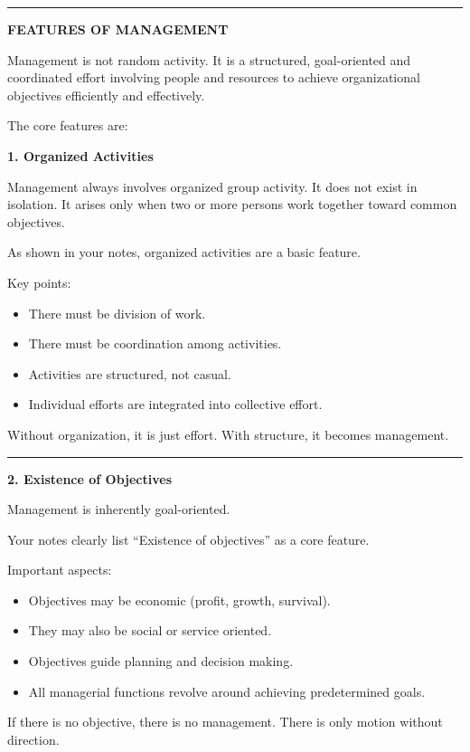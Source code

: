 \documentclass[10pt,a4paper]{article}
\newcommand{\separator}{\vspace{0.4em}\noindent\rule{\linewidth}{0.6pt}\vspace{0.4em}}
\begin{document}
\separator

\begin{center}
  \large\textbf{FEATURES OF MANAGEMENT}
\end{center}

Management is not random activity. It is a structured, goal-oriented and coordinated effort
involving people and resources to achieve organizational objectives efficiently and effectively.

The core features are:

\textbf{1. Organized Activities}

Management always involves organized group activity. It does not exist in isolation. It
arises only when two or more persons work together toward common objectives.

As shown in your notes, organized activities are a basic feature.

Key points:

\begin{itemize}
  \item There must be division of work.
  \item There must be coordination among activities.
  \item Activities are structured, not casual.
  \item Individual efforts are integrated into collective effort.
\end{itemize}

Without organization, it is just effort. With structure, it becomes management.

\separator

\textbf{2. Existence of Objectives}

Management is inherently goal-oriented.

Your notes clearly list ``Existence of objectives'' as a core feature.

Important aspects:

\begin{itemize}
  \item Objectives may be economic (profit, growth, survival).
  \item They may also be social or service oriented.
  \item Objectives guide planning and decision making.
  \item All managerial functions revolve around achieving predetermined goals.
\end{itemize}

If there is no objective, there is no management. There is only motion without direction.
\end{document}
